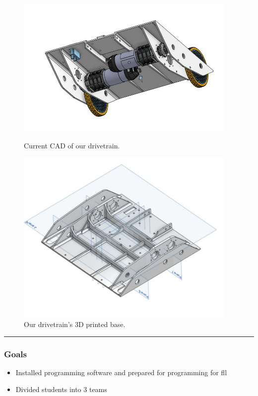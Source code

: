 \begin{figure}[ht]
\centering
\begin{minipage}[b]{.48\textwidth}
  \centering
  \includegraphics[width=0.95\textwidth]{Meetings/October/10-14-21/10-14-21_CAD_Figure1.JPG}
  \caption{Current CAD of our drivetrain.}
  \label{fig:pic2}
\end{minipage}%
\hfill%
\begin{minipage}[b]{.48\textwidth}
  \centering
  \includegraphics[width=0.95\textwidth]{Meetings/October/10-14-21/10-14-21_CAD_Figure2.JPG}
  \caption{Our drivetrain's 3D printed base.}
  \label{fig:pic3}
\end{minipage}
\end{figure}

\noindent\hfil\rule{\textwidth}{.4pt}\hfil
\subsubsection*{Goals}
\begin{itemize}
    \item Installed programming software and prepared for programming for fll
    \item Divided students into 3 teams
 
\end{itemize} 


